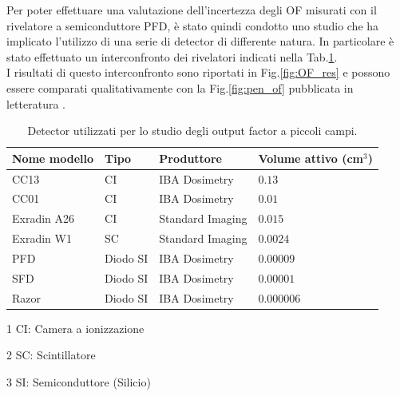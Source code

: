 Per poter effettuare una valutazione dell'incertezza degli OF misurati con il rivelatore a semiconduttore PFD, è stato quindi condotto uno studio che ha implicato l'utilizzo di una serie di detector di differente natura. In particolare è stato effettuato un interconfronto dei rivelatori indicati nella Tab.\ref{tab:OF_inter}.\\ I risultati di questo interconfronto sono riportati in Fig.\ref{fig:OF_res} e possono essere comparati qualitativamente con la Fig.\ref{fig:pen_of} pubblicata in letteratura \cite{Das2008}.
\begin{table}[!t]
\centering
{}
\begin{threeparttable}
\begin{tabular}{llll}
\toprule
Nome modello & Tipo & Produttore & Volume attivo (cm$^3$)\\
\midrule
CC13 & CI\tnote{1} & IBA Dosimetry & $0.13$\\
CC01 & CI & IBA Dosimetry & $0.01$\\
Exradin A26 & CI & Standard Imaging & $0.015$ \\
Exradin W1 & SC\tnote{2} & Standard Imaging & $0.0024$ \\
PFD & Diodo SI\tnote{3} & IBA Dosimetry & $0.00009$ \\
SFD & Diodo SI & IBA Dosimetry & $0.00001$ \\
Razor & Diodo SI & IBA Dosimetry & $0.000006$ \\
\bottomrule
\end{tabular}
\begin{tablenotes}[para]
\item[1] CI: Camera a ionizzazione
\item[2] SC: Scintillatore
\item[3] SI: Semiconduttore (Silicio)
\end{tablenotes}
\end{threeparttable}
\caption{Detector utilizzati per lo studio degli output factor a piccoli campi.}
\label{tab:OF_inter}
\end{table}
